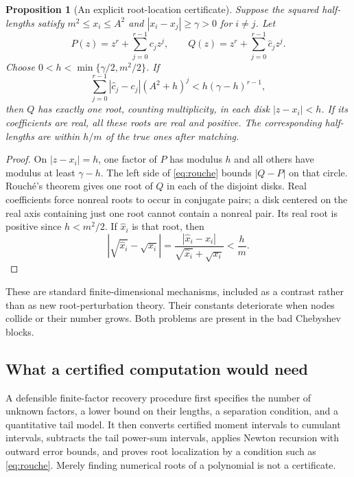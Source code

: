 \documentclass[11pt,a4paper]{article}
\newtheorem{proposition}[theorem]{Proposition}
\theoremstyle{definition}
\theoremstyle{remark}
\begin{document}
\begin{proposition}[An explicit root-location certificate]\label{prop:rouche}
Suppose the squared half-lengths satisfy
$m^2\le x_i\le A^2$ and $|x_i-x_j|\ge\gamma>0$ for $i\ne j$.
Let
\[
 P(z)=z^r+\sum_{j=0}^{r-1}c_jz^j,\qquad
 Q(z)=z^r+\sum_{j=0}^{r-1}\widehat c_jz^j.
\]
Choose $0<h<\min\{\gamma/2,m^2/2\}$. If
\begin{equation}\label{eq:rouche}
 \sum_{j=0}^{r-1}|\widehat c_j-c_j|(A^2+h)^j
           <h(\gamma-h)^{r-1},
\end{equation}
then $Q$ has exactly one root, counting multiplicity, in each disk
$|z-x_i|<h$. If its coefficients are real, all these roots are real
and positive. The corresponding half-lengths are within $h/m$ of the
true ones after matching.
\end{proposition}

\begin{proof}
On $|z-x_i|=h$, one factor of $P$ has modulus $h$ and all others have
modulus at least $\gamma-h$. The left side of \eqref{eq:rouche} bounds
$|Q-P|$ on that circle. Rouch\'e's theorem gives one root of $Q$ in each
of the disjoint disks. Real coefficients force nonreal roots to occur
in conjugate pairs; a disk centered on the real axis containing just
one root cannot contain a nonreal pair. Its real root is positive since
$h<m^2/2$. If $\widehat x_i$ is that root, then
\[
 |\sqrt{\widehat x_i}-\sqrt{x_i}|
 =\frac{|\widehat x_i-x_i|}{\sqrt{\widehat x_i}+\sqrt{x_i}}
 <\frac hm.
\]
\end{proof}

These are standard finite-dimensional mechanisms, included as a contrast
rather than as new root-perturbation theory. Their constants deteriorate
when nodes collide or their number grows. Both problems are present in
the bad Chebyshev blocks.

\subsection{What a certified computation would need}

A defensible finite-factor recovery procedure first specifies the number
of unknown factors, a lower bound on their lengths, a separation
condition, and a quantitative tail model. It then converts certified
moment intervals to cumulant intervals, subtracts the tail power-sum
intervals, applies Newton recursion with outward error bounds, and proves
root localization by a condition such as \eqref{eq:rouche}. Merely finding
numerical roots of a polynomial is not a certificate.
\end{document}
